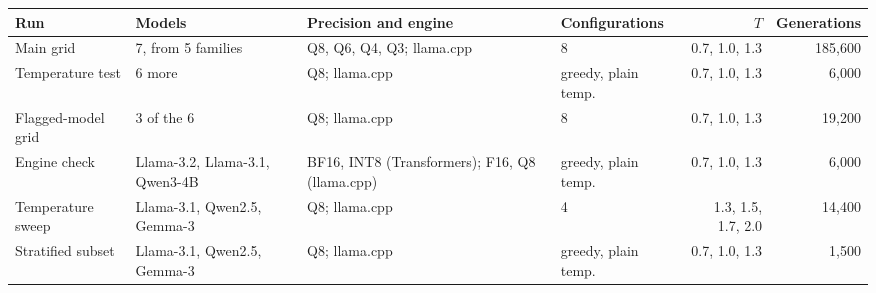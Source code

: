 \begin{tabular}{@{}llllrr@{}}
\toprule
Run & Models & Precision and engine & Configurations & $T$ & Generations \\
\midrule
Main grid & 7, from 5 families & Q8, Q6, Q4, Q3; llama.cpp & 8 & 0.7, 1.0, 1.3 & 185,600 \\
Temperature test & 6 more & Q8; llama.cpp & greedy, plain temp. & 0.7, 1.0, 1.3 & 6,000 \\
Flagged-model grid & 3 of the 6 & Q8; llama.cpp & 8 & 0.7, 1.0, 1.3 & 19,200 \\
Engine check & Llama-3.2, Llama-3.1, Qwen3-4B & BF16, INT8 (Transformers); F16, Q8 (llama.cpp) & greedy, plain temp. & 0.7, 1.0, 1.3 & 6,000 \\
Temperature sweep & Llama-3.1, Qwen2.5, Gemma-3 & Q8; llama.cpp & 4 & 1.3, 1.5, 1.7, 2.0 & 14,400 \\
Stratified subset & Llama-3.1, Qwen2.5, Gemma-3 & Q8; llama.cpp & greedy, plain temp. & 0.7, 1.0, 1.3 & 1,500 \\
\bottomrule
\end{tabular}
